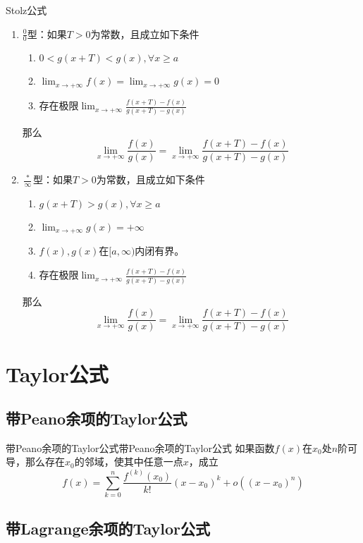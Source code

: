 \documentclass[lang = cn, scheme = chinese, thmcnt = section]{elegantbook}
\begin{document}
\begin{theorem}{Stolz公式}
	\begin{enumerate}
		\item $\displaystyle\frac{0}{0}$型：如果$T>0$为常数，且成立如下条件
		\begin{enumerate}
			\item $0<g(x+T)<g(x),\forall x\ge a$
			\item $\displaystyle\lim_{x\to+\infty}f(x)=\lim_{x\to+\infty}g(x)=0$
			\item 存在极限$\displaystyle\lim_{x\to+\infty}\frac{f(x+T)-f(x)}{g(x+T)-g(x)}$
		\end{enumerate}
		那么
		$$
		\lim_{x\to+\infty}\frac{f(x)}{g(x)}=\lim_{x\to+\infty}\frac{f(x+T)-f(x)}{g(x+T)-g(x)}
		$$
		\item $\displaystyle\frac{*}{\infty}$​型：如果$T>0$为常数，且成立如下条件
		\begin{enumerate}
			\item $g(x+T)>g(x),\forall x\ge a$
			\item $\displaystyle\lim_{x\to+\infty}g(x)=+\infty$
			\item $f(x),g(x)$在$[a,\infty)$内闭有界。
			\item 存在极限$\displaystyle\lim_{x\to+\infty}\frac{f(x+T)-f(x)}{g(x+T)-g(x)}$
		\end{enumerate}
		那么
		$$
		\lim_{x\to+\infty}\frac{f(x)}{g(x)}=\lim_{x\to+\infty}\frac{f(x+T)-f(x)}{g(x+T)-g(x)}
		$$
	\end{enumerate}
\end{theorem}

\section{Taylor公式}

\subsection{带Peano余项的Taylor公式}

\begin{theorem}{带Peano余项的Taylor公式}{带Peano余项的Taylor公式}
	如果函数$f(x)$在$x_0$处$n$阶可导，那么存在$x_0$的邻域，使其中任意一点$x$，成立
	$$
	f(x)
	=\sum_{k=0}^{n}\frac{f^{(k)}(x_0)}{k!}(x-x_0)^k+o((x-x_0)^n)
	$$
\end{theorem}

\subsection{带Lagrange余项的Taylor公式}
\end{document}
